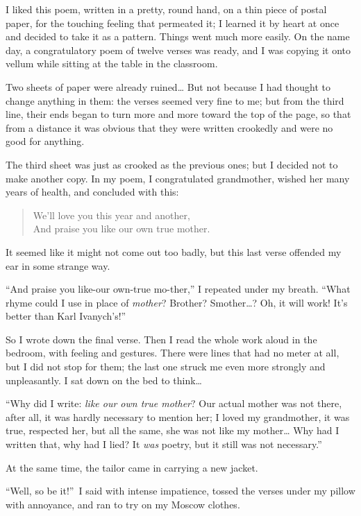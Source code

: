 I liked this poem, written in a pretty, round hand, on a thin piece of postal paper, for the touching feeling that permeated it; I learned it by heart at once and decided to take it as a pattern. Things went much more easily. On the name day, a congratulatory poem of twelve verses was ready, and I was copying it onto vellum while sitting at the table in the classroom.

Two sheets of paper were already ruined\ldots{} But not because I had thought to change anything in them: the verses seemed very fine to me; but from the third line, their ends began to turn more and more toward the top of the page, so that from a distance it was obvious that they were written crookedly and were no good for anything.

The third sheet was just as crooked as the previous ones; but I decided not to make another copy. In my poem, I congratulated grandmother, wished her many years of health, and concluded with this:

\begin{verse}
We'll love you this year and another,\\
And praise you like our own true mother.
\end{verse}

It seemed like it might not come out too badly, but this last verse offended my ear in some strange way.

``And praise you like-our own-true mo-ther,'' I repeated under my breath. ``What rhyme could I use in place of \emph{mother}? Brother? Smother\ldots{}? Oh, it will work! It's better than Karl Ivanych's!'' %

So I wrote down the final verse. Then I read the whole work aloud in the bedroom, with feeling and gestures. There were lines that had no meter at all, but I did not stop for them; the last one struck me even more strongly and unpleasantly. I sat down on the bed to think\ldots{}

``Why did I write: \textit{like our own true mother}? Our actual mother was not there, after all, it was hardly necessary to mention her; I loved my grandmother, it was true, respected her, but all the same, she was not like my mother\ldots{} Why had I written that, why had I lied? It \emph{was} poetry, but it still was not necessary.'' %

At the same time, the tailor came in carrying a new jacket.

``Well, so be it!''~I said with intense impatience, tossed the verses under my pillow with annoyance, and ran to try on my Moscow clothes. %

